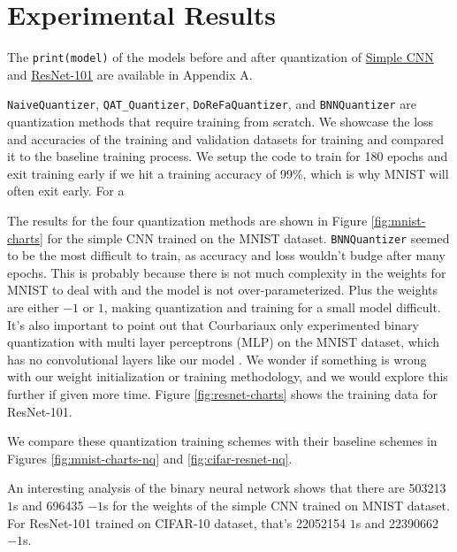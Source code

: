 \documentclass{article}
\begin{document}
\section{Experimental Results}

The \verb|print(model)| of the models before and after quantization of \hyperref[sec:A1]{Simple CNN} and \hyperref[sec:A2]{ResNet-101} are available in Appendix A.

\verb|NaiveQuantizer|, \verb|QAT_Quantizer|, \verb|DoReFaQuantizer|, and \verb|BNNQuantizer| are quantization methods that require training from scratch. We showcase the loss and accuracies of the training and validation datasets for training and compared it to the baseline training process. We setup the code to train for 180 epochs and exit training early if we hit a training accuracy of 99\%, which is why MNIST will often exit early. For a

The results for the four quantization methods are shown in Figure \ref{fig:mnist-charts} for the simple CNN trained on the MNIST dataset. \verb|BNNQuantizer| seemed to be the most difficult to train, as accuracy and loss wouldn't budge after many epochs. This is probably because there is not much complexity in the weights for MNIST to deal with and the model is not over-parameterized. Plus the weights are either $-1$ or $1$, making quantization and training for a small model difficult. It's also important to point out that Courbariaux only experimented binary quantization with multi layer perceptrons (MLP) on the MNIST dataset, which has no convolutional layers like our model \cite{binarynn}. We wonder if something is wrong with our weight initialization or training methodology, and we would explore this further if given more time. Figure \ref{fig:resnet-charts} shows the training data for ResNet-101.

We compare these quantization training schemes with their baseline schemes in Figures \ref{fig:mnist-charts-nq} and \ref{fig:cifar-resnet-nq}.

An interesting analysis of the binary neural network shows that there are 503213 $1$s and 696435 $-1$s for the weights of the simple CNN trained on MNIST dataset. For ResNet-101 trained on CIFAR-10 dataset, that's 22052154 $1$s and 22390662 $-1$s.
\end{document}
